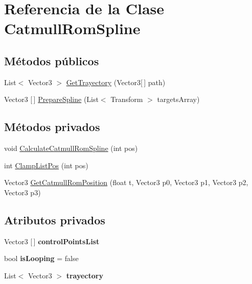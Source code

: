 \hypertarget{class_catmull_rom_spline}{}\section{Referencia de la Clase Catmull\+Rom\+Spline}
\label{class_catmull_rom_spline}
\subsection*{Métodos públicos}
\begin{DoxyCompactItemize}
\item 
List$<$ Vector3 $>$ \mbox{\hyperlink{class_catmull_rom_spline_a3d1f936cf80fb6177e2fb598c8cd6adf}{Get\+Trayectory}} (Vector3\mbox{[}$\,$\mbox{]} path)
\item 
Vector3 \mbox{[}$\,$\mbox{]} \mbox{\hyperlink{class_catmull_rom_spline_a99e5a690f95ef08186b9b785baf13a50}{Prepare\+Spline}} (List$<$ Transform $>$ targets\+Array)
\end{DoxyCompactItemize}
\subsection*{Métodos privados}
\begin{DoxyCompactItemize}
\item 
void \mbox{\hyperlink{class_catmull_rom_spline_a0bf2480dc2c46201f8ac5937a179ea4e}{Calculate\+Catmull\+Rom\+Spline}} (int pos)
\item 
int \mbox{\hyperlink{class_catmull_rom_spline_a3ba7de330679168566750a9dfdc42534}{Clamp\+List\+Pos}} (int pos)
\item 
Vector3 \mbox{\hyperlink{class_catmull_rom_spline_ad15822896d9310c20eba4b395220411c}{Get\+Catmull\+Rom\+Position}} (float t, Vector3 p0, Vector3 p1, Vector3 p2, Vector3 p3)
\end{DoxyCompactItemize}
\subsection*{Atributos privados}
\begin{DoxyCompactItemize}
\item 
\mbox{\label{class_catmull_rom_spline_a849ca4b6ac6f852a463a800430daf777}} 
Vector3 \mbox{[}$\,$\mbox{]} {\bfseries control\+Points\+List}
\item 
\mbox{\label{class_catmull_rom_spline_a5ba0543d62e110611688190af0e1af76}} 
bool {\bfseries is\+Looping} = false
\item 
\mbox{\label{class_catmull_rom_spline_abf1cd3b958eecde443028bc4e0aa58df}} 
List$<$ Vector3 $>$ {\bfseries trayectory}
\end{DoxyCompactItemize}


